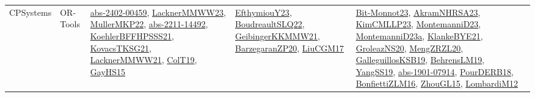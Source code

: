 {\begin{longtable}{lp{3cm}>{\raggedright}p{6cm}>{\raggedright}p{6cm}p{8cm}}
CPSystems & OR-Tools & \href{articles/abs-2402-00459.pdf}{abs-2402-00459}\cite{abs-2402-00459}, \href{articles/LacknerMMWW23.pdf}{LacknerMMWW23}\cite{LacknerMMWW23}, \href{articles/MullerMKP22.pdf}{MullerMKP22}\cite{MullerMKP22}, \href{articles/abs-2211-14492.pdf}{abs-2211-14492}\cite{abs-2211-14492}, \href{articles/KoehlerBFFHPSSS21.pdf}{KoehlerBFFHPSSS21}\cite{KoehlerBFFHPSSS21}, \href{papers/KovacsTKSG21.pdf}{KovacsTKSG21}\cite{KovacsTKSG21}, \href{papers/LacknerMMWW21.pdf}{LacknerMMWW21}\cite{LacknerMMWW21}, \href{papers/ColT19.pdf}{ColT19}\cite{ColT19}, \href{papers/GayHS15.pdf}{GayHS15}\cite{GayHS15} & \href{papers/EfthymiouY23.pdf}{EfthymiouY23}\cite{EfthymiouY23}, \href{papers/BoudreaultSLQ22.pdf}{BoudreaultSLQ22}\cite{BoudreaultSLQ22}, \href{papers/GeibingerKKMMW21.pdf}{GeibingerKKMMW21}\cite{GeibingerKKMMW21}, \href{papers/BarzegaranZP20.pdf}{BarzegaranZP20}\cite{BarzegaranZP20}, \href{papers/LiuCGM17.pdf}{LiuCGM17}\cite{LiuCGM17} & \href{papers/Bit-Monnot23.pdf}{Bit-Monnot23}\cite{Bit-Monnot23}, \href{articles/AkramNHRSA23.pdf}{AkramNHRSA23}\cite{AkramNHRSA23}, \href{papers/KimCMLLP23.pdf}{KimCMLLP23}\cite{KimCMLLP23}, \href{articles/MontemanniD23.pdf}{MontemanniD23}\cite{MontemanniD23}, \href{articles/MontemanniD23a.pdf}{MontemanniD23a}\cite{MontemanniD23a}, \href{papers/KlankeBYE21.pdf}{KlankeBYE21}\cite{KlankeBYE21}, \href{papers/GroleazNS20.pdf}{GroleazNS20}\cite{GroleazNS20}, \href{articles/MengZRZL20.pdf}{MengZRZL20}\cite{MengZRZL20}, \href{papers/GalleguillosKSB19.pdf}{GalleguillosKSB19}\cite{GalleguillosKSB19}, \href{papers/BehrensLM19.pdf}{BehrensLM19}\cite{BehrensLM19}, \href{papers/YangSS19.pdf}{YangSS19}\cite{YangSS19}, \href{articles/abs-1901-07914.pdf}{abs-1901-07914}\cite{abs-1901-07914}, \href{articles/PourDERB18.pdf}{PourDERB18}\cite{PourDERB18}, \href{papers/BonfiettiZLM16.pdf}{BonfiettiZLM16}\cite{BonfiettiZLM16}, \href{papers/ZhouGL15.pdf}{ZhouGL15}\cite{ZhouGL15}, \href{articles/LombardiM12.pdf}{LombardiM12}\cite{LombardiM12}\\

\end{longtable}}
